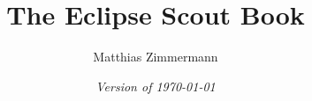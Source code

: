 
\author{Matthias Zimmermann}
\title{\Huge\bf The Eclipse Scout Book}
\ifpdf
  \isodate
\fi
\date{\emph{Version of \today}}
\maketitle

